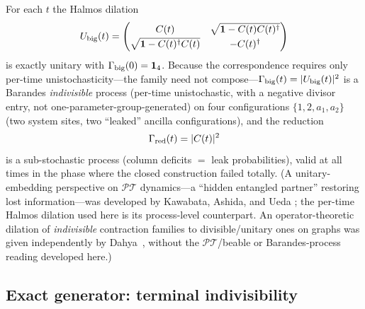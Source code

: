 \documentclass[11pt]{article}
\theoremstyle{definition}
\theoremstyle{remark}
\newcommand{\PT}{\mathcal{PT}}
\newcommand{\Gam}{\Gamma}
\begin{document}
For each $t$ the Halmos dilation \cite{Halmos1950,SzNagy2010}
\begin{equation}
U_{\rm big}(t)=
\begin{pmatrix}
C(t) & \sqrt{\mathbf 1-C(t)C(t)^{\dagger}}\\[2pt]
\sqrt{\mathbf 1-C(t)^{\dagger}C(t)} & -C(t)^{\dagger}
\end{pmatrix}
\label{eq:halmos}
\end{equation}
is exactly unitary with $\Gam_{\rm big}(0)=\mathbf 1_4$. Because the
correspondence requires only per-time unistochasticity---the family need
not compose---$\Gam_{\rm big}(t)=|U_{\rm big}(t)|^{2}$ is a Barandes
\emph{indivisible} process (per-time unistochastic, with a negative
divisor entry, not one-parameter-group-generated) on four configurations
$\{1,2,a_1,a_2\}$ (two system sites, two ``leaked'' ancilla
configurations), and the reduction
\begin{equation}
\Gam_{\rm red}(t)=|C(t)|^{2}
\label{eq:gred}
\end{equation}
is a sub-stochastic process (column deficits $=$ leak probabilities), valid
at all times in the phase where the closed construction failed totally.
(A unitary-embedding perspective on $\PT$ dynamics---a ``hidden entangled
partner'' restoring lost information---was developed by Kawabata, Ashida,
and Ueda \cite{KAU2017}; the per-time Halmos dilation used here is its
process-level counterpart. An operator-theoretic dilation of
\emph{indivisible} contraction families to divisible/unitary ones on
graphs was given independently by Dahya~\cite{Dahya2025}, without the
$\PT$/beable or Barandes-process reading developed here.)

\subsection{Exact generator: terminal indivisibility}
\end{document}
